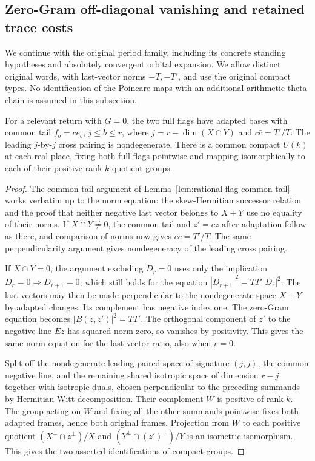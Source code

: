\subsection{Zero-Gram off-diagonal vanishing and retained trace costs}
\label{sec:flag-retained-zero-gram-traces}

We continue with the original period family, including its
concrete standing hypotheses and absolutely convergent orbital
expansion. We allow distinct original words, with last-vector norms
\(-T,-T'\), and use the original compact types. No identification
of the Poincare maps with an additional arithmetic theta chain
is assumed in this subsection.

\begin{lemma}
\label{lem:zero-gram-unequal-norm}
For a relevant return with \(G=0\), the two full flags have adapted
bases with common tail \(f_b=c e_b\), \(j\le b\le r\),
where \(j=r-\dim(X\cap Y)\) and \(c\bar c=T'/T\).
The leading \(j\)-by-\(j\) cross pairing is nondegenerate.
There is a common compact \(U(k)\) at each real place, fixing both
full flags pointwise and mapping isomorphically to each of their
positive rank-\(k\) quotient groups.
\end{lemma}
\begin{proof}
The common-tail argument of
Lemma~\ref{lem:rational-flag-common-tail} works verbatim up to
the norm equation: the skew-Hermitian successor relation and
the proof that neither negative last vector belongs to \(X+Y\)
use no equality of their norms. If \(X\cap Y\ne0\), the common
tail and \(z'=cz\) after adaptation follow as there, and
comparison of norms now gives \(c\bar c=T'/T\).
The same perpendicularity argument gives nondegeneracy of the
leading cross pairing.

If \(X\cap Y=0\), the argument excluding \(D_r=0\) uses only
the implication \(D_r=0\Rightarrow D_{r+1}=0\), which still
holds for the equation
\(|D_{r+1}|^2=TT'|D_r|^2\). The last vectors may then be made
perpendicular to the nondegenerate space \(X+Y\) by adapted
changes. Its complement has negative index one. The zero-Gram
equation becomes \(|B(z,z')|^2=TT'\). The orthogonal component of
\(z'\) to the negative line \(Ez\) has squared norm zero, so
vanishes by positivity. This gives the same norm equation
for the last-vector ratio, also when \(r=0\).

Split off the nondegenerate leading paired space of signature
\((j,j)\), the common negative line, and the remaining shared
isotropic space of dimension \(r-j\) together with isotropic
duals, chosen perpendicular to the preceding summands by
Hermitian Witt decomposition. Their complement \(W\) is positive
of rank \(k\). The group acting on \(W\) and fixing all the
other summands pointwise fixes both adapted frames, hence both
original frames. Projection from \(W\) to each positive
quotient \((X^\perp\cap z^\perp)/X\) and
\((Y^\perp\cap (z')^\perp)/Y\) is an isometric isomorphism.
This gives the two asserted identifications of compact groups.
\end{proof}

